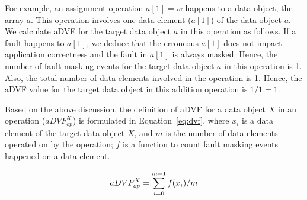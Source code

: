 For example, an assignment operation $a[1] = w$ 
happens to a data object, the array $a$.
This operation involves one data element ($a[1]$) of the data object $a$.
We calculate aDVF for the target data object $a$ in this operation as follows.
If a fault happens to $a[1]$, we deduce that 
the erroneous $a[1]$ does not impact application correctness and the fault in $a[1]$ is always masked. Hence, the number of fault masking events for
the target data object $a$ in this operation is 1. Also, the total number of data elements involved in the operation is 1.
Hence, the aDVF value for the target data object in this addition operation is $1/1=1$.

Based on the above discussion, the definition of aDVF for a data object $X$ in an operation ($aDVF^{X}_{op}$)
is formulated in Equation~\ref{eq:dvf}, where 
$x_i$ is a data element of the target data object $X$, and $m$ is the number of data elements operated on by the operation;
$f$ is a function to count fault masking events happened on a data element. %
\begin{comment}
$f(i)$ %
is a function to count fault masking events
happened to a data element $i$ of the target data object operated on by the operation. There are $m$ data elements of the target data object operated on by the operation.
\end{comment}
\vspace{-1pt}
\begin{equation} 
\label{eq:dvf}
\footnotesize
	aDVF^{X}_{op} = \sum_{i=0}^{m-1}f(x_i)/m
\end{equation}
\vspace{-5pt}

